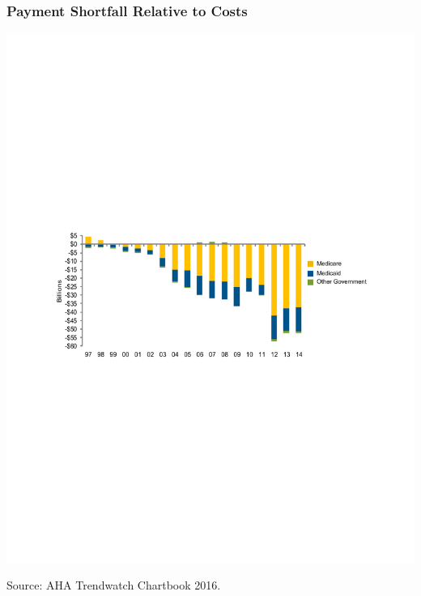 \documentclass[ucs,9pt]{beamer}
\begin{document}
\begin{frame}
\frametitle{Payment Shortfall Relative to Costs}
\begin{center}
\includegraphics[scale=0.7]{4_7}
\end{center}
\tiny Source: AHA Trendwatch Chartbook 2016.  
\end{frame}
\end{document}
